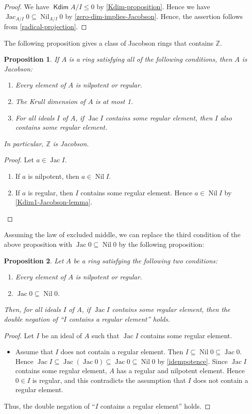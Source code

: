 \documentclass[11pt]{article}
\newtheorem{proposition}{Proposition}[section]
\theoremstyle{definition}
\newcommand\Z{\mathbb{Z}}
\DeclareMathOperator{\Nil}{Nil}
\DeclareMathOperator{\Jac}{Jac}
\DeclareMathOperator{\Kdim}{\mathsf{Kdim}}
\begin{document}
\begin{proof}
    We have $\Kdim A/I\le0$ by \cref{Kdim-proposition}. Hence we have $\Jac_{A/I}0\subseteq\Nil_{A/I}0$ by \cref{zero-dim-implies-Jacobson}. Hence, the assertion follows from \cref{radical-projection}.
\end{proof}
The following proposition gives a class of Jacobson rings that contains $\Z$.
\begin{proposition}\label{Kdim1-Jacobson}
    If $A$ is a ring satisfying all of the following conditions, then $A$ is Jacobson:
    \begin{enumerate}
        \item Every element of $A$ is nilpotent or regular.
        \item The Krull dimension of $A$ is at most 1.
        \item For all ideals $I$ of $A$, if $\Jac I$ contains some regular element, then $I$ also contains some regular element.
    \end{enumerate}
    In particular, $\Z$ is Jacobson.
\end{proposition}
\begin{proof}
    Let $a\in\Jac I$.
    \begin{enumerate}
        \item If $a$ is nilpotent, then $a\in\Nil I$.
        \item If $a$ is regular, then $I$ contains some regular element. Hence $a\in\Nil I$ by \cref{Kdim1-Jacobson-lemma}.\qedhere
    \end{enumerate}
\end{proof}
Assuming the law of excluded middle, we can replace the third condition of the above proposition with $\Jac0\subseteq\Nil0$ by the following proposition:
\begin{proposition}\label{simplify-Kdim1-Jacobson}
    Let $A$ be a ring satisfying the following two conditions:
    \begin{enumerate}
        \item Every element of $A$ is nilpotent or regular.
        \item $\Jac0\subseteq\Nil0$.
    \end{enumerate}
    Then, for all ideals $I$ of $A$, if $\Jac I$ contains some regular element, then the double negation of ``$I$ contains a regular element'' holds.
\end{proposition}
\begin{proof}
    Let $I$ be an ideal of $A$ such that $\Jac I$ contains some regular element.
    \begin{itemize}
        \item Assume that $I$ does not contain a regular element. Then $I\subseteq\Nil 0\subseteq\Jac0$.
        Hence $\Jac I\subseteq\Jac(\Jac 0)\subseteq\Jac 0\subseteq\Nil0$ by \cref{idempotence}.
        Since $\Jac I$ contains some regular element, $A$ has a regular and nilpotent element. Hence $0\in I$ is regular, and this contradicts the assumption that $I$ does not contain a regular element.
    \end{itemize}
    Thus, the double negation of ``$I$ contains a regular element'' holds.
\end{proof}
\end{document}
